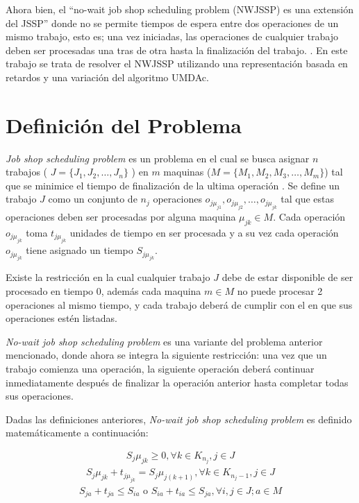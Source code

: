\documentclass[12pt,a4paper]{article}
\begin{document}
    Ahora bien, el ``no-wait job shop scheduling problem (NWJSSP) es una extensión del JSSP'' donde no se permite tiempos de espera entre dos operaciones de un mismo trabajo, esto es; una vez iniciadas, las operaciones de cualquier trabajo deben ser procesadas una tras de otra hasta la finalización del trabajo. \cite{valenzuela_2022}. En este trabajo se trata de resolver el NWJSSP utilizando una representación basada en retardos y una variación del algoritmo UMDAc.
    
\section{Definición del Problema}

    \textit{Job shop scheduling problem} es un problema en el cual se busca asignar $n$ trabajos ( $J = \{ J_1, J_2, \ldots, J_n \}$ ) en $m$ maquinas ($M = \{ M_1, M_2, M_3, \ldots, M_m \}$) tal que se minimice el tiempo de finalización de la ultima operación \cite{jssp}. Se define un trabajo $J$ como un conjunto de $n_j$ operaciones  $o_{j\mu_{j1}}, o_{j\mu_{j2}}, \ldots, o_{j\mu_{jk}}$  tal que estas operaciones deben ser procesadas por alguna maquina $\mu_{jk} \in M$. Cada operación $o_{j\mu_{jk}}$ toma $t_{j\mu_{jk}}$ unidades de tiempo en ser procesada y a su vez cada operación $o_{j\mu_{jk}}$ tiene asignado un tiempo $S_{j\mu_{jk}}$.
     
     
     Existe la restricción en la cual cualquier trabajo $J$ debe de estar disponible de ser procesado en tiempo 0, además cada maquina $m \in M$ no puede procesar 2 operaciones al mismo tiempo, y cada trabajo deberá de cumplir con el en que sus operaciones estén listadas. 
     
     \textit{No-wait job shop scheduling problem} es una variante del problema anterior mencionado, donde ahora se integra la siguiente restricción: una vez que un trabajo comienza una operación, la siguiente operación deberá continuar inmediatamente después de finalizar la operación anterior hasta completar todas sus operaciones.
     
     Dadas las definiciones anteriores, \textit{No-wait job shop scheduling problem} es definido matemáticamente a continuación:
     
     \begin{gather}
     \label{eq:r1}
         S_j\mu_{jk} \geq 0, \forall k \in K_{n_j}, j \in J
     \end{gather}
     \begin{gather}
     \label{eq:r2}
        S_j\mu_{jk} + t_{j\mu_{jk}} = S_j\mu_{j(k+1)}, \forall k \in K_{n_j - 1}, j \in J   
     \end{gather}
     \begin{gather}
     \label{eq:r3}
         S_{ja} + t_{ja} \leq S_{ia} \text{ o } S_{ia} + t_{ia} \leq S_{ja}, \forall i,j \in J; a \in M
     \end{gather}
    
\end{document}
